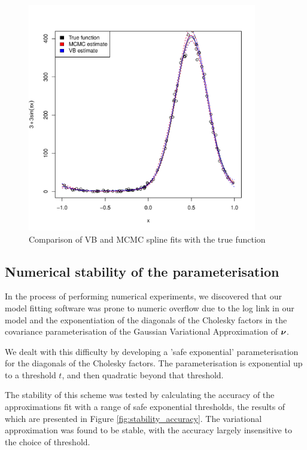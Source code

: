 			\begin{figure}
				\label{fig:spline}
				\caption{Comparison of VB and MCMC spline fits with the true function}
				\includegraphics[width=0.95 \textwidth, height=100mm]{code/results/accuracy_plots_spline_gva2.pdf}
			\end{figure}
					
					
			\subsection{Numerical stability of the parameterisation}
			
			In the process of performing numerical experiments, we discovered that our model fitting software was 
			prone to numeric overflow due to the log link in our model and the exponentiation of the diagonals of the
			Cholesky factors in the covariance parameterisation of the Gaussian Variational Approximation of ${\boldsymbol \nu}$.
			
			We dealt with this difficulty by developing a 'safe exponential' parameterisation for the diagonals of the
			Cholesky factors. The parameterisation is exponential up to a threshold $t$, and then quadratic beyond that
			threshold.
			
			The stability of this scheme was tested by calculating the accuracy of the approximations fit with a range
			of safe exponential thresholds, the results of which are presented in Figure \ref{fig:stability_accuracy}.
			The variational approximation was found to be stable, with the accuracy largely insensitive to the choice of
			threshold.
			
